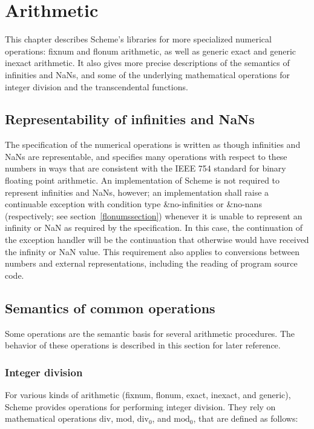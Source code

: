 \chapter{Arithmetic}
\label{numberchapter}

This chapter describes Scheme's libraries for more specialized
numerical operations: fixnum and flonum arithmetic, as well as generic
exact and generic inexact arithmetic.  It also gives more precise
descriptions of the semantics of infinities and NaNs, and some of the
underlying mathematical operations for integer division and the
transcendental functions.

\section{Representability of infinities and NaNs}
\label{infinitiesnanssection}

The specification of the numerical operations is written as though
infinities and NaNs are representable, and specifies many operations
with respect to these numbers in ways that are consistent with the
IEEE 754 standard for binary floating point arithmetic.  
An implementation of Scheme is not required to represent infinities and
NaNs, however;
an implementation shall raise a continuable exception with
condition type {\cf\&no-infinities} or {\cf\&no-nans} (respectively;
see section~\ref{flonumssection})
whenever it is unable to represent an infinity or NaN as required by
the specification.  In this case, the continuation of the exception
handler will be the continuation that otherwise would have received
the infinity or NaN value.  This requirement also applies to
conversions between numbers and external representations, including
the reading of program source code.

\section{Semantics of common operations}

Some operations are the semantic basis for several arithmetic
procedures.  The behavior of these operations is described in this
section for later reference.

\subsection{Integer division}
\label{integerdivision}

For various kinds of arithmetic (fixnum, flonum, exact, inexact, and
generic), Scheme provides operations for performing integer
division.  They rely on mathematical operations $\mathrm{div}$,
$\mathrm{mod}$, $\mathrm{div}_0$, and
$\mathrm{mod}_0$, that are defined as follows:


